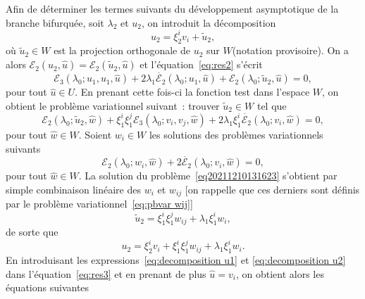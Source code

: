\documentclass{article}
\newcommand{\nocomma}{}
\begin{document}
Afin de déterminer les termes suivants du développement asymptotique
de la branche bifurquée, soit $\lambda_2$ et $u_2$, on introduit la
décomposition
\begin{equation}
  u_2 = \xi_2^i v_i + \tilde{u}_2,
\end{equation}
où $\tilde{u}_2 \in W$ est la projection orthogonale de $u_2$ sur
$W$(notation provisoire). On a alors $\mathcal{E}_2 (u_2, \hat{u})
=\mathcal{E}_2 (\tilde{u}_2, \hat{u})$ et l'équation~\eqref{eq:res2}
s'écrit
\begin{equation}
  \mathcal{E}_3 (\lambda_0 ; u_1, u_1, \hat{u}) + 2 \lambda_1
  \dot{\mathcal{E}_2} (\lambda_0 ; u_1, \hat{u}) +\mathcal{E}_2 (\lambda_0 ;
  \tilde{u}_2, \hat{u}) = 0,
\end{equation}
pour tout $\hat{u} \in U$. En prenant cette fois-ci la fonction test dans
l'espace $W$, on obtient le problème variationnel suivant~: trouver
$\tilde{u}_2 \in W$ tel que
\begin{equation}
  \label{eq20211210131623} \mathcal{E}_2 (\lambda_0 ; {\tilde{u}_2} , \hat{w})
  + \xi_1^i \xi_1^j \mathcal{E}_3 (\lambda_0 ; v_i, v_j, \hat{w}) + 2
  \lambda_1 \xi_1^i  \dot{\mathcal{E}_2} (\lambda_0 ; v_i, \hat{w}) = 0,
\end{equation}
pour tout $\hat{w} \in W$. Soient $w_i \in W$ les solutions des problèmes
variationnels suivants
\begin{equation}
  \label{eq:pbvar wi} \mathcal{E}_2 (\lambda_0 ; w_i, \hat{w}) + 2
  \dot{\mathcal{E}_2} (\lambda_0 ; v_i, \hat{w}) = 0,
\end{equation}
pour tout $\hat{w} \in W$. La solution du
problème~\eqref{eq20211210131623} s'obtient par simple combinaison
linéaire des $w_i$ et $w_{ij}$ [on rappelle que ces derniers sont
définis par le problème variationnel~\eqref{eq:pbvar wij}]
\begin{equation}
  \tilde{u}_2 = \xi_1^i \xi_1^j w_{i \nocomma j} + \lambda_1 \xi_1^i w_i,
\end{equation}
de sorte que
\begin{equation}
  \label{eq:decomposition u2} u_2 = \xi_2^i v_i + \xi_1^i \xi_1^j w_{i
  \nocomma j} + \lambda_1 \xi_1^i w_i .
\end{equation}
En introduisant les expressions~\eqref{eq:decomposition u1} et
\eqref{eq:decomposition u2} dans l'équation~\eqref{eq:res3} et en prenant
de plus $\hat{u} = v_i$, on obtient alors les équations suivantes
\end{document}

